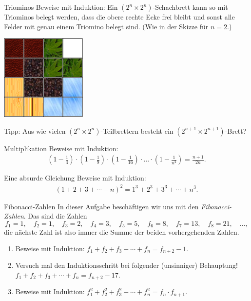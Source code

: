\documentclass{../zirkelblatt1415}
\begin{document}
 \begin{aufgabe}{Triominos}
Beweise mit Induktion: Ein $(2^n \times 2^n)$-Schachbrett kann so mit Triominos belegt werden, dass die obere rechte Ecke frei bleibt 
und sonst alle Felder mit genau einem Triomino belegt sind. (Wie in der Skizze f\"ur $n=2$.)

\begin{center}
 \includegraphics[scale=1]{triominos.png}
\end{center}

\noindent Tipp: Aus wie vielen $(2^n \times 2^n)$-Teilbrettern besteht ein $(2^{n+1} \times 2^{n+1})$-Brett?
 \end{aufgabe}

\begin{aufgabe}{Multiplikation}
Beweise mit Induktion: 
\begin{align*}
\left(1 - \frac{1}{4}\right) \cdot \left(1 - \frac{1}{9}\right) \cdot \left(1 -
\frac{1}{16}\right) \cdot \ldots \cdot \left(1 - \frac{1}{n^2}\right) = \frac{n+1}{2n}.
\end{align*}
\vspace{-1em}
\end{aufgabe}

\begin{aufgabe}{Eine absurde Gleichung}
Beweise mit Induktion:
\begin{align*}
(1 + 2 + 3 + \cdots + n)^2 = 1^3 + 2^3 + 3^3 + \cdots + n^3.
\end{align*}
\vspace{-2em}
\end{aufgabe}

\enlargethispage{2.5em}

\begin{aufgabe}{Fibonacci-Zahlen}
In dieser Aufgabe besch\"aftigen wir uns mit den \emph{Fibonacci-Zahlen}.
Das sind die Zahlen
\[ f_1 = 1, \quad f_2 = 1, \quad f_3 = 2, \quad f_4 = 3, \quad f_5 = 5,
\quad f_6 = 8, \quad f_7 = 13, \quad f_8 = 21, \quad \ldots, \]
die n\"achste Zahl ist also immer die Summe der beiden vorhergehenden
Zahlen.
\begin{enumerate}
\item Beweise mit Induktion:
$f_1 + f_2 + f_3 + \cdots + f_n = f_{n+2} - 1$.
\item Versuch mal den Induktionsschritt bei folgender (unsinniger) Behauptung! \\
$f_1 + f_2 + f_3 + \cdots + f_n = f_{n+2} - 17$.
\item Beweise mit Induktion:
$f_1^2 + f_2^2 + f_3^2 + \cdots + f_n^2 = f_n \cdot f_{n+1}$.
\end{enumerate}\fixlistspacing
\end{aufgabe}
\end{document}
